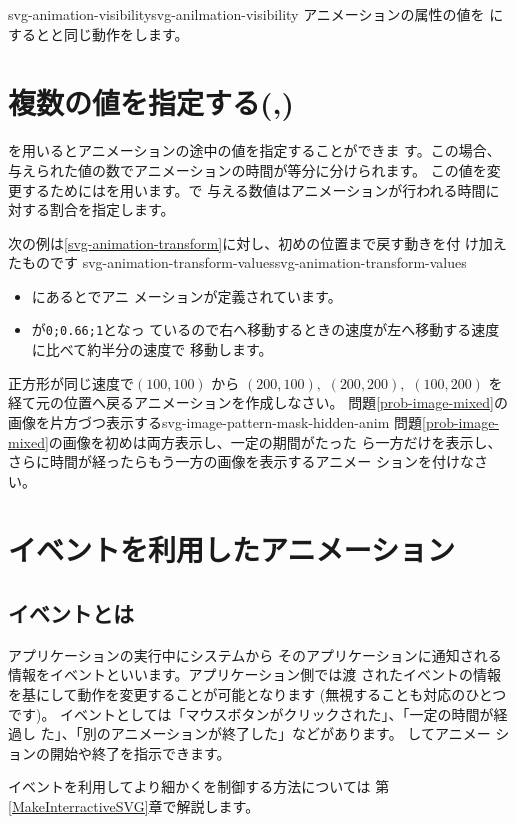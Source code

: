 %
{svg-animation-visibility}{svg-anilmation-visibility}
アニメーションの属性の値を
にするとと同じ動作をします。
\section{複数の値を指定する(,)}
を用いるとアニメーションの途中の値を指定することができま
す。この場合、与えられた値の数でアニメーションの時間が等分に分けられます。
この値を変更するためにはを用います。で
与える数値はアニメーションが行われる時間に対する割合を指定します。

次の例は\ref{svg-animation-transform}に対し、初めの位置まで戻す動きを付
け加えたものです%
{}
{svg-animation-transform-values}{svg-animation-transform-values}
\begin{itemize}
 \item {}にあるとでアニ
メーションが定義されています。
 \item {}が\texttt{0;0.66;1}となっ
ているので右へ移動するときの速度が左へ移動する速度に比べて約半分の速度で
移動します。
\end{itemize}
{ 正方形が同じ速度で$(100,100)$ から $(200,100),$ $(200,200),$
$(100,200)$ を経て元の位置へ戻るアニメーションを作成しなさい。}
{問題\ref{prob-image-mixed}の画像を片方づつ表示する}{svg-image-pattern-mask-hidden-anim}
{ 問題\ref{prob-image-mixed}の画像を初めは両方表示し、一定の期間がたった
ら一方だけを表示し、さらに時間が経ったらもう一方の画像を表示するアニメー
ションを付けなさい。}
\ifSummer\else
\section{イベントを利用したアニメーション}
\subsection{イベントとは}
アプリケーションの実行中にシステムから
そのアプリケーションに通知される情報をイベントといいます。アプリケーション側では渡
されたイベントの情報を基にして動作を変更することが可能となります
(無視することも対応のひとつです)。
イベントとしては「マウスボタンがクリックされた」、「一定の時間が経過し
た」、「別のアニメーションが終了した」などがあります。
%
してアニメー
ションの開始や終了を指示できます。
\iffalse
イベントとしては次のようなものがあります。
\begin{itemize}
 \item マウスボタンがクリックされた。
 \item 一定の時間が経過した。
 \item 別のアニメーションが終了した。
\end{itemize}
\fi
イベントを利用してより細かく\SVG を制御する方法については
第\ref{MakeInterractiveSVG}章で解説します。

